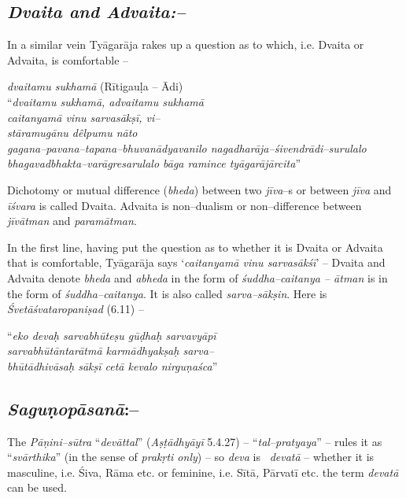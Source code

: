 \subsection*{\textit{Dvaita and Advaita:–}}

In a similar vein Tyāgarāja rakes up a question as to which, i.e. Dvaita or Advaita, is comfortable –

\begin{myquote}
\textit{dvaitamu sukhamā} (Rītigauḷa – Ādi)\\ “\textit{dvaitamu sukhamā, advaitamu sukhamā}\\\textit{caitanyamā vinu sarvasākṣī, vi–}\\\textit{stāramugānu dêlpumu nāto}\\\textit{gagana–pavana–tapana–bhuvanādyavanilo nagadharāja–śivendrādi–surulalo}\\\textit{bhagavadbhakta–varāgresarulalo bāga ramince tyāgarājārcita}”
\end{myquote}

Dichotomy or mutual difference (\textit{bheda}) between two \textit{jīva}–s or between \textit{jīva} and \textit{īśvara} is called Dvaita. Advaita is non–dualism or non–difference between \textit{jīvātman} and \textit{paramātman}. 

In the first line, having put the question as to whether it is Dvaita or Advaita that is comfortable, Tyāgarāja says ‘\textit{caitanyamā vinu sarvasākśī}’ – Dvaita and Advaita denote \textit{bheda} and \textit{abheda} in the form of \textit{śuddha–caitanya – ātman} is in the form of \textit{śuddha–caitanya}. It is also called \textit{sarva–sākṣin}. Here is \textit{Śvetāśvataropaniṣad} (6.11) –

\begin{myquote}
“\textit{eko devaḥ sarvabhūteṣu gūḍhaḥ sarvavyāpī}\\\textit{sarvabhūtāntarātmā karmādhyakṣaḥ sarva–}\\\textit{bhūtādhivāsaḥ sākṣī cetā kevalo nirguṇaśca}”
\end{myquote}


\subsection*{\textit{Saguṇopāsanā}:–}

The \textit{Pāṇini–sūtra} “\textit{devāttal}” (\textit{Aṣṭādhyāyī} 5.4.27) – “\textit{tal–pratyaya}” – rules it as “\textit{svārthika}” (in the sense of \textit{prakṛti only}) – so \textit{deva} is  \textit{devatā} – whether it is masculine, i.e. Śiva, Rāma etc. or feminine, i.e. Sītā\textit{,} Pārvatī etc. the term \textit{devatā} can be used. 


